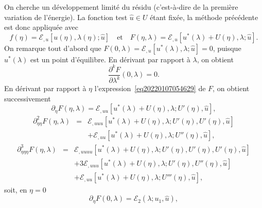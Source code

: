 \documentclass{article}
\newcommand{\nocomma}{}
\newcommand{\nosymbol}{}
\begin{document}
On cherche un développement limité du résidu (c'est-à-dire de
la première variation de l'énergie). La fonction test $\hat{u} \in U$
étant fixée, la méthode précédente est donc appliquée
avec
\begin{equation}
  \label{eq20220107054629} f (\eta) =\mathcal{E}_{, u} [u (\eta), \lambda
  (\eta) ; \hat{u}] \quad \text{et} \quad F (\eta, \lambda) =\mathcal{E}_{, u}
  [u^{\ast} (\lambda) + U (\eta), \lambda ; \hat{u}] .
\end{equation}
On remarque tout d'abord que $F (0, \lambda) =\mathcal{E}_{, u} [u^{\ast}
(\lambda), \lambda ; \hat{u}] = 0$, puisque $u^{\ast} (\lambda)$ est un point
d'équilibre. En dérivant par rapport à $\lambda$, on obtient
\begin{equation}
  \label{eq20211112164240} \frac{\partial^k F}{\partial \lambda^k} (0,
  \lambda) = 0.
\end{equation}
En dérivant par rapport à $\eta$ l'expression~\eqref{eq20220107054629}
de $F$, on obtient successivement
\begin{equation}
  \partial_{\eta} F (\eta, \lambda) =\mathcal{E}_{, u \nocomma u} [u^{\ast}
  (\lambda) + U (\eta), \lambda ; U' (\eta), \hat{u}],
\end{equation}
\begin{eqnarray}
  \partial_{\eta \nocomma \eta}^2 F (\eta, \lambda) & = & \mathcal{E}_{, u
  \nocomma u \nocomma u} [u^{\ast} (\lambda) + U (\eta), \lambda ; U' (\eta),
  U' (\eta), \hat{u}] \nonumber\\
  &  & \nosymbol +\mathcal{E}_{, u \nocomma u} [u^{\ast} (\lambda) + U
  (\eta), \lambda ; U'' (\eta), \hat{u}],
\end{eqnarray}
\begin{eqnarray}
  \partial_{\eta \nocomma \eta \nocomma \eta}^3 F (\eta, \lambda) & = &
  \mathcal{E}_{, u \nocomma u \nocomma u \nocomma u} [u^{\ast} (\lambda) + U
  (\eta), \lambda ; U' (\eta), U' (\eta), U' (\eta), \hat{u}] \nonumber\\
  &  & \nosymbol + 3\mathcal{E}_{, u \nocomma u \nocomma u} [u^{\ast}
  (\lambda) + U (\eta), \lambda ; U' (\eta), U'' (\eta), \hat{u}] \nonumber\\
  &  & \nosymbol +\mathcal{E}_{, u \nocomma u} [u^{\ast} (\lambda) + U
  (\eta), \lambda ; U''' (\eta), \hat{u}],
\end{eqnarray}
soit, en $\eta = 0$
\begin{equation}
  \partial_{\eta} F (0, \lambda) =\mathcal{E}_2 (\lambda ; u_1, \hat{u}),
\end{equation}
\end{document}
